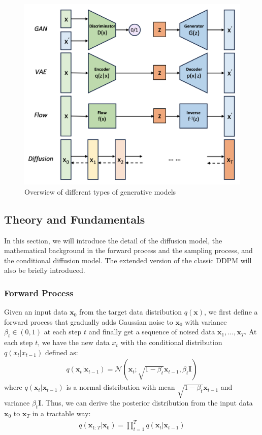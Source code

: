 \documentclass[12pt,DIV14,BCOR12mm,a4paper,footinclude=false,headinclude,parskip=half-,twoside,openright,cleardoublepage=empty,toc=index,bibliography=totoc,listof=totoc]{scrreprt}
\numberwithin{equation}{chapter}
\begin{document}
\begin{figure}[h]
	\centering
	\includegraphics[scale=.3]{img/gen.png}
	\caption{Overwiew of different types of generative models}
	\label{img:gen}
\end{figure}

\subsection{Theory and Fundamentals}\label{sec:theory}
In this section, we will introduce the detail of the diffusion model, the mathematical background in the forward process and the sampling process, and the conditional diffusion model. The extended version of the classic DDPM will also be briefly introduced.

\subsubsection{Forward Process}
Given an input data $\mathbf{x}_{0}$ from the target data distribution $q(\mathbf{x})$, we first define a forward process that gradually adds Gaussian noise to $\mathbf{x}_{0}$ with variance $\beta_{t}\in (0, 1)$ at each step $t$ and finally get a sequence of noised data $\mathbf{x}_{1},...,\mathbf{x}_{T}$. At each step $t$, we have the new data $x_{t}$ with the conditional distribution $q(x_{t}|x_{t-1})$ defined as:
\begin{align}
  q(\mathbf{x}_{t}|\mathbf{x}_{t-1}) = \mathcal{N}(\mathbf{x}_{t}; \sqrt{1-\beta_{t}}\mathbf{x}_{t-1}, \beta_{t}\mathbf{I})
\end{align}
where $q(\mathbf{x}_{t}|\mathbf{x}_{t-1})$ is a normal distribution with mean $\sqrt{1-\beta_{t}}\mathbf{x}_{t-1}$ and variance $\beta_{t}\mathbf{I}$. Thus, we can derive the posterior distribution from the input data $\mathbf{x}_{0}$ to $\mathbf{x}_{T}$ in a tractable way:
\begin{align}
  q(\mathbf{x}_{1:T}|\mathbf{x}_{0}) = \prod_{t=1}^{T}q(\mathbf{x}_{t}|\mathbf{x}_{t-1})
\end{align}
\end{document}
